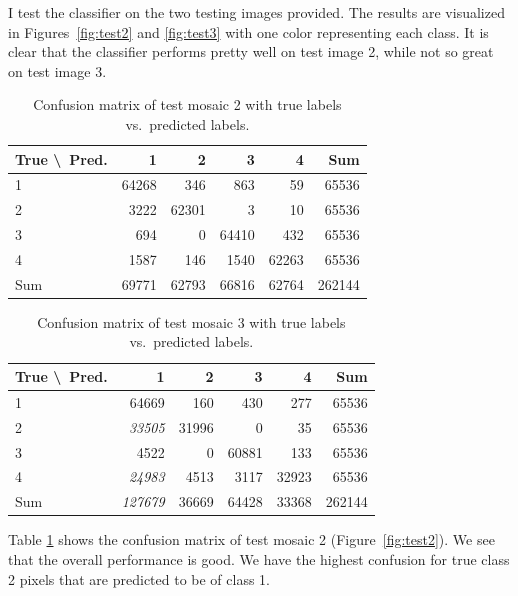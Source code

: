 \documentclass[a4paper]{article}
\begin{document}
I test the classifier on the two testing images provided. The results
are visualized in Figures~\ref{fig:test2} and \ref{fig:test3} with one
color representing each class. It is clear that the classifier performs
pretty well on test image 2, while not so great on test image 3.

\begin{table}
    \caption{Confusion matrix of test mosaic 2 with true labels vs.\
    predicted labels.}
    \centering
    \begin{tabular}{l | r | r | r | r | r}
        \small{True \textbackslash\ Pred.} & 1 & 2 & 3 & 4 & Sum \\ \hline
        1 & 64268 &    346 &    863 &     59 &   65536 \\ \hline
        2 & 3222  & 62301  &     3  &    10  &  65536  \\ \hline
        3 & 694   &    0   & 64410  &   432  &  65536  \\ \hline
        4 & 1587  &   146  &  1540  & 62263  &  65536  \\ \hline
        Sum & 69771 &  62793 &  66816 &  62764 &  262144
    \end{tabular}
    \label{tab:conf2}
\end{table}

\begin{table}
    \caption{Confusion matrix of test mosaic 3 with true labels vs.\
    predicted labels.}
    \centering
    \begin{tabular}{l | r | r | r | r | r}
        \small{True \textbackslash\ Pred.} & 1 & 2 & 3 & 4 & Sum \\ \hline
        1 &    64669 &   160 &   430 &   277 &  65536 \\ \hline
        2 &    \emph{33505} & 31996 &     0 &    35 &  65536 \\ \hline
        3 &     4522 &     0 & 60881 &   133 &  65536 \\ \hline
        4 &    \emph{24983} &  4513 &  3117 & 32923 &  65536 \\ \hline
        Sum & \emph{127679} & 36669 & 64428 & 33368 & 262144
    \end{tabular}
    \label{tab:conf3}
\end{table}

Table \ref{tab:conf2} shows the confusion matrix of test mosaic 2
(Figure~\ref{fig:test2}). We see that the overall performance is good.
We have the highest confusion for true class 2 pixels that are predicted
to be of class 1.
\end{document}
